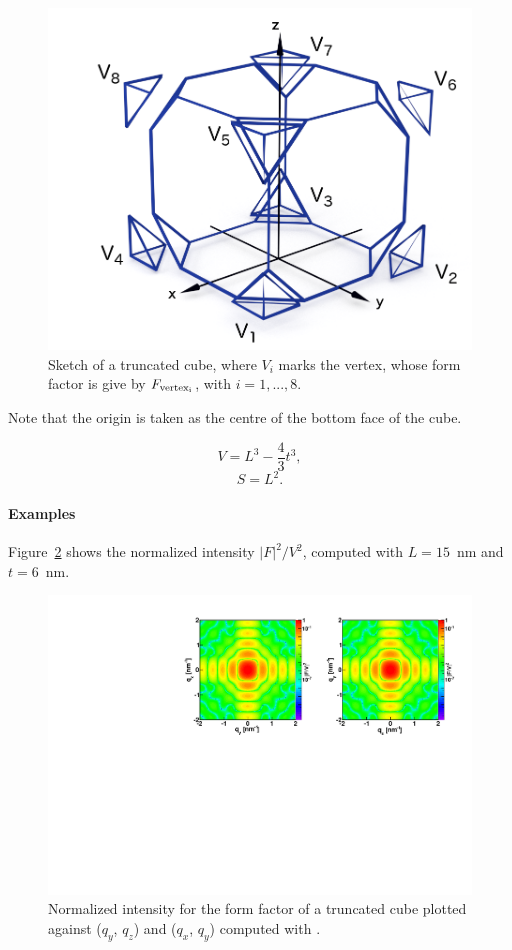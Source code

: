 \begin{figure}[h]
\begin{center}
\includegraphics[width=.5\textwidth]{fig/drawing/SketchTruncatedcube.png}
\end{center}
\caption{Sketch of a truncated cube, where $V_i$ marks the vertex, whose form factor is give by $F_{\rm{vertex}_i}$, with $i=1,..., 8$.}
\label{fig:FFTrcubesketchaxes}
\end{figure}

Note that the origin is taken as the centre of the bottom face of the cube.



\begin{equation*}
  V = L^3 - \dfrac{4}{3}t^3,
\end{equation*}
\begin{equation*}
  S = L^2.
\end{equation*}

\paragraph{Examples}
Figure~\ref{fig:FFtrunccubeEx} shows the normalized intensity
$|F|^2/V^2$, computed with $L=15$~nm  and $t=6$~nm.

\begin{figure}[h]
\begin{center}
\includegraphics[angle=-90,width=\textwidth]{fig/ff/figfftruncatedcube.pdf}
\end{center}
\caption{Normalized intensity for the form factor of a truncated cube plotted against ($q_y$, $q_z$) and  ($q_x$, $q_y$)
  computed with .}
\label{fig:FFtrunccubeEx}
\end{figure}

